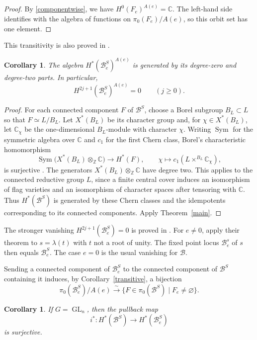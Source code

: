 \documentclass[12pt]{article}
\theoremstyle{paperplain}
\newtheorem{corollary}[theorem]{Corollary}
\DeclareMathOperator{\Sym}{Sym}
\DeclareMathOperator{\GL}{GL}
\newcommand{\C}{\mathbb C}
\newcommand{\Z}{\mathbb Z}
\newcommand{\B}{\mathcal B}
\begin{document}
\begin{proof}
    By \eqref{componentwise}, we have $H^0(F_e)^{A(e)}=\C$. The left-hand side identifies with the algebra of functions on $\pi_0(F_e)/A(e)$, so this orbit set has one element.
\end{proof}

This transitivity is also proved in \cite[Lemma~2.2(iii)]{DLP}.

\begin{corollary}\label{generators}
    The algebra $H^*(\B_e^S)^{A(e)}$ is generated by its degree-zero and degree-two parts. In particular,
    \[
        H^{2j+1}(\B_e^S)^{A(e)}=0\qquad(j\ge0).
    \]
\end{corollary}

\begin{proof}
    For each connected component $F$ of $\B^S$, choose a Borel subgroup $B_L\subset L$ so that $F\simeq L/B_L$. Let $X^*(B_L)$ be its character group and, for $\chi\in X^*(B_L)$, let $\C_\chi$ be the one-dimensional $B_L$-module with character $\chi$. Writing $\Sym$ for the symmetric algebra over $\C$ and $c_1$ for the first Chern class, Borel's characteristic homomorphism
    \[
        \Sym\bigl(X^*(B_L)\otimes_{\Z}\C\bigr)
            \longrightarrow H^*(F),\qquad
        \chi\longmapsto c_1(L\times^{B_L}\C_\chi),
    \]
    is surjective \cite{Borel}. The generators $X^*(B_L)\otimes_{\Z}\C$ have degree two. This applies to the connected reductive group $L$, since a finite central cover induces an isomorphism of flag varieties and an isomorphism of character spaces after tensoring with $\C$. Thus $H^*(\B^S)$ is generated by these Chern classes and the idempotents corresponding to its connected components. Apply Theorem~\ref{main}.
\end{proof}

The stronger vanishing $H^{2j+1}(\B_e^S)=0$ is proved in \cite[Theorem~3.9]{DLP}. For $e\ne0$, apply their theorem to $s=\lambda(t)$ with $t$ not a root of unity. The fixed point locus $\B_e^s$ of $s$ then equals $\B_e^S$. The case $e=0$ is the usual vanishing for $\B$.

Sending a connected component of $\B_e^S$ to the connected component of $\B^S$ containing it induces, by Corollary~\ref{transitive}, a bijection
\[
    \pi_0(\B_e^S)/A(e)
    \xrightarrow{\sim}
    \{F\in\pi_0(\B^S)\mid F_e\ne\varnothing\}.
\]

\begin{corollary}\label{type-a-surjective}
    If $G=\GL_n$, then the pullback map
    \[
        i^*\colon H^*(\B^S)\longrightarrow H^*(\B_e^S)
    \]
    is surjective.
\end{corollary}
\end{document}
